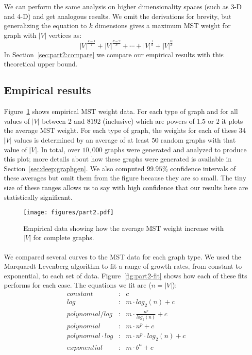 We can perform the same analysis on higher dimensionality spaces (such as 3-D
and 4-D) and get analogous results. We omit the derivations for brevity, but
generalizing the equation to $k$ dimensions gives a maximum MST weight for graph
with $|V|$ vertices as:
\[ |V|^{\frac{k-1}{k}} + |V|^{\frac{k-2}{k}} + \cdots + |V|^{\frac{1}{k}} +
|V|^{\frac{0}{k}} \]
In Section~\ref{sec:part2:compare} we compare our empirical results with this
theoretical upper bound.

\subsection{Empirical results}
\paragraph{}
Figure~\ref{fig:part2} shows empirical MST weight data. For each type of
graph and for all values of $|V|$
between $2$ and $8192$ (inclusive) which are powers of $1.5$ or $2$ it
plots the average MST weight.  For each type of graph, the
weights for each of these 34 $|V|$ values is determined by
an average of at least 50 random graphs with that value of $|V|$.  In
total, over $10,000$ graphs
were generated and analyzed to produce this plot; more details about how
these graphs were generated is available in
Section~\ref{sec:deep:graphgen}. We
also computed $99.95\%$ confidence intervals of these averages but omit
them from the figure because they are so small.  The tiny size of these
ranges allows us to say with high confidence that our results here are
statistically significant.

\begin{figure}[htb!]
\centering
\texttt{[image: figures/part2.pdf]}
\caption{Empirical data showing how the average MST weight increase with $|V|$
  for complete graphs.}
\label{fig:part2}
\end{figure}

\paragraph{}
We compared several curves to the MST data for each graph type. We used the
Marquardt-Levenberg algorithm to fit a range of growth rates, from constant
to exponential, to each set of data.
Figure~\ref{fig:part2-fit} shows how each of these fits performs for each case.
The equations we fit are ($n = |V|$):
\begin{eqnarray*}
constant&:& c \\
log&:& m \cdot log_2(n) + c \\
polynomial / log&:& m \cdot \frac{n^p}{log_2(n)} + c \\
polynomial&:& m \cdot n^p + c \\
polynomial \cdot log&:& m \cdot n^p \cdot log_2(n) + c \\
exponential&:& m \cdot b^n + c
\end{eqnarray*}

